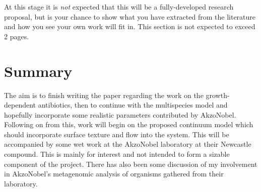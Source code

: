 \documentclass[a4paper,12pt]{article}
\begin{document}
At this stage it is {\em not} expected that this will be a fully-developed
research proposal, but is your chance to show what you have extracted from the
literature and how you see your own work will fit in. This section is
not expected to exceed 2 pages.
 
\section{Summary}

The aim is to finish writing the paper regarding the work on the growth-dependent antibiotics, then to continue with the multispecies
model and hopefully incorporate some realistic parameters contributed by AkzoNobel.  Following on from this, work will begin on the proposed
continuum model which should incorporate surface texture and flow into the system.  This will be accompanied by some wet work at the AkzoNobel laboratory
at their Newcastle compound.  This is mainly for interest and not intended to form a sizable component of the project.  There has also been some discussion of
my involvement in AkzoNobel's metagenomic analysis of organisms gathered from their laboratory.


\end{document}
